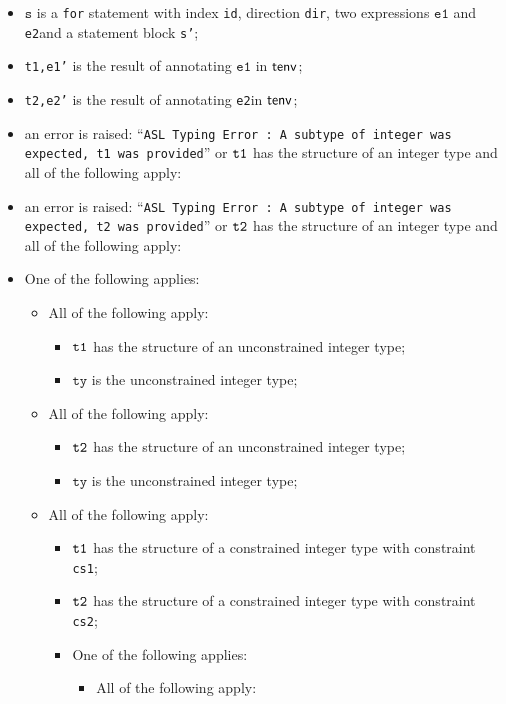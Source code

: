 \documentclass{book}
\newcommand\veone[0]{\texttt{e1}}
\newcommand\vetwo[0]{\texttt{e2}}
\newcommand\vs[0]{\texttt{s}}
\newcommand\tty[0]{\texttt{ty}}
\begin{document}
   \begin{itemize}
   \item $\vs$ is a \texttt{for} statement with index \texttt{id}, direction \texttt{dir}, two expressions
      $\veone$ and \vetwo and a statement block \texttt{s'};
   \item \texttt{t1,e1'} is the result of annotating $\veone$ in $\textsf{tenv}$;
   \item \texttt{t2,e2'} is the result of annotating \vetwo in $\textsf{tenv}$;
   \item an error is raised: ``\texttt{ASL Typing Error : A subtype of integer was expected, t1 was provided}'' or $\texttt{t1}$ has the structure of an integer type and all of the following apply:
   \item an error is raised: ``\texttt{ASL Typing Error : A subtype of integer was expected, t2 was provided}'' or $\texttt{t2}$ has the structure of an integer type and all of the following apply:
   \item One of the following applies:
     \begin{itemize}
       \item All of the following apply:
         \begin{itemize}
           \item $\texttt{t1}$ has the structure of an unconstrained integer type;
           \item $\tty$ is the unconstrained integer type;
         \end{itemize}
       \item All of the following apply:
         \begin{itemize}
           \item $\texttt{t2}$ has the structure of an unconstrained integer type;
           \item $\tty$ is the unconstrained integer type;
         \end{itemize}
       \item All of the following apply:
         \begin{itemize}
           \item $\texttt{t1}$ has the structure of a constrained integer type with constraint \texttt{cs1};
           \item $\texttt{t2}$ has the structure of a constrained integer type with constraint \texttt{cs2};
           \item One of the following applies:
             \begin{itemize}
               \item All of the following apply:

\end{itemize}
\end{itemize}
\end{itemize}
\end{itemize}
\end{document}
